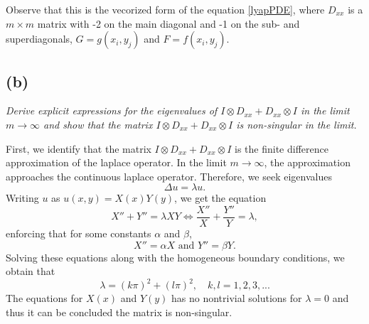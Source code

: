 Observe that this is the vecorized form of the equation \eqref{lyapPDE}, where
$D_{xx}$ is a $m\times m$ matrix with -2 on the main diagonal and -1 on the sub- and superdiagonals, $G = g(x_i,y_j)$ and $F = f(x_i,y_j)$. 
\subsection*{(b)}
\emph{Derive explicit expressions for the eigenvalues of $I\otimes D_{xx}+D_{xx}\otimes I$ in the limit $m\to\infty$ and show that the matrix $I\otimes D_{xx}+D_{xx}\otimes I$ is non-singular in the limit.}

First, we identify that the matrix $I\otimes D_{xx}+D_{xx}\otimes I$ is the finite difference approximation of the laplace operator. In the limit $m\to\infty$, the approximation approaches the continuous laplace operator. Therefore, we seek eigenvalues
\begin{equation}
\Delta u = \lambda u.
\end{equation} 
Writing $u$ as $u(x,y) = X(x)Y(y)$, we get the equation
\begin{equation}
X''+Y'' = \lambda XY \Leftrightarrow \frac{X''}{X}+\frac{Y''}{Y} = \lambda,
\end{equation}
enforcing that for some constants $\alpha$ and $\beta$, 
\begin{equation}
X''=\alpha X\text{ and }Y'' = \beta Y.
\end{equation}
Solving these equations along with the homogeneous boundary conditions, we obtain that 
\begin{equation}
\lambda = (k\pi)^2+(l\pi)^2,\quad k,l = 1,2,3,...
\end{equation}
The equations for $X(x)$ and $Y(y)$ has no nontrivial solutions for $\lambda =0$ and thus it can be concluded the matrix is non-singular. 
